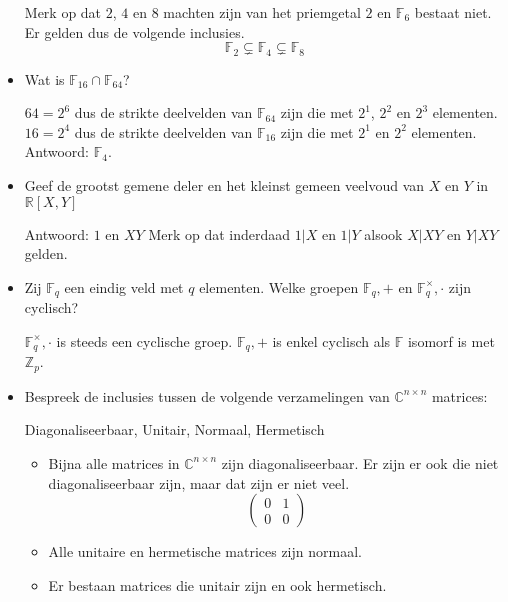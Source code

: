 \documentclass[main.tex]{subfiles}
\begin{document}
\begin{itemize}
   Merk op dat $2$, $4$ en $8$ machten zijn van het priemgetal $2$ en $\mathbb{F}_{6}$ bestaat niet. Er gelden dus de volgende inclusies.
   \[ \mathbb{F}_{2} \subsetneq \mathbb{F}_{4} \subsetneq \mathbb{F}_{8} \]

 \item Wat is $\mathbb{F}_{16}\cap \mathbb{F}_{64}$?

   $64=2^{6}$ dus de strikte deelvelden van $\mathbb{F}_{64}$ zijn die met $2^{1}$, $2^{2}$ en $2^{3}$ elementen.
   $16=2^{4}$ dus de strikte deelvelden van $\mathbb{F}_{16}$ zijn die met $2^{1}$ en $2^{2}$ elementen.
   Antwoord: $\mathbb{F}_{4}$.

 \item Geef de grootst gemene deler en het kleinst gemeen veelvoud van $X$ en $Y$ in $\mathbb{R}[X,Y]$

   Antwoord: $1$ en $XY$
   Merk op dat inderdaad $1 | X$ en $1 | Y$ alsook $X | XY$ en $Y | XY$ gelden.

 \item Zij $\mathbb{F}_{q}$ een eindig veld met $q$ elementen.
   Welke groepen $\mathbb{F}_{q},+$ en $\mathbb{F}_{q}^{\times},\cdot$ zijn cyclisch?

   $\mathbb{F}_{q}^{\times},\cdot$ is steeds een cyclische groep.
   $\mathbb{F}_{q},+$ is enkel cyclisch als $\mathbb{F}$ isomorf is met $\mathbb{Z}_{p}$.

 \item Bespreek de inclusies tussen de volgende verzamelingen van $\mathbb{C}^{n \times n}$ matrices:
   \begin{center}
     Diagonaliseerbaar, Unitair, Normaal, Hermetisch
   \end{center}
   \begin{itemize}
   \item 
     Bijna alle matrices in $\mathbb{C}^{n\times n}$ zijn diagonaliseerbaar.
     Er zijn er ook die niet diagonaliseerbaar zijn, maar dat zijn er niet veel.
     \[
     \begin{pmatrix}
       0 & 1\\
       0 & 0
     \end{pmatrix}
     \]
   \item Alle unitaire en hermetische matrices zijn normaal.
   \item Er bestaan matrices die unitair zijn en ook hermetisch. 
   \end{itemize}
 \end{itemize}
\end{document}
